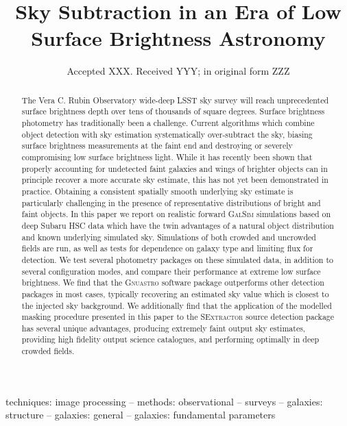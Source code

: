 \documentclass[fleqn,usenatbib,useAMS]{mnras}
\title[LSB Sky Subtraction]{Sky Subtraction in an Era of Low Surface Brightness Astronomy}
\date{Accepted XXX. Received YYY; in original form ZZZ}
\newcommand*{\SExtractor}{\textsc{SExtractor}\xspace}
\newcommand*{\Gnuastro}{\textsc{Gnuastro}\xspace}
\newcommand*{\GalSim}{\textsc{GalSim}\xspace}
\newcommand*{\VRO}{Vera C. Rubin Observatory\xspace}
\begin{document}
\label{firstpage}
\pagerange{\pageref{firstpage}--\pageref{lastpage}}
\maketitle



\begin{abstract}
The \VRO wide-deep LSST sky survey will reach unprecedented surface brightness depth over tens of thousands of square degrees. Surface brightness photometry has traditionally been a challenge. Current algorithms which combine object detection with sky estimation systematically over-subtract the sky, biasing surface brightness measurements at the faint end and destroying or severely compromising low surface brightness light. While it has recently been shown that properly accounting for undetected faint galaxies and wings of brighter objects can in principle recover a more accurate sky estimate, this has not yet been demonstrated in practice. Obtaining a consistent spatially smooth underlying sky estimate is particularly challenging in the presence of representative distributions of bright and faint objects. In this paper we report on realistic forward \GalSim simulations based on deep Subaru HSC data which have the twin advantages of a natural object distribution and known underlying simulated sky. Simulations of both crowded and uncrowded fields are run, as well as tests for dependence on galaxy type and limiting flux for detection. We test several photometry packages on these simulated data, in addition to several configuration modes, and compare their performance at extreme low surface brightness. We find that the \Gnuastro software package outperforms other detection packages in most cases, typically recovering an estimated sky value which is closest to the injected sky background. We additionally find that the application of the modelled masking procedure presented in this paper to the \SExtractor source detection package has several unique advantages, producing extremely faint output sky estimates, providing high fidelity output science catalogues, and performing optimally in deep crowded fields.
\end{abstract}

\begin{keywords}
techniques: image processing -- methods: observational -- surveys -- galaxies: structure -- galaxies: general -- galaxies: fundamental parameters
\end{keywords}
\end{document}
